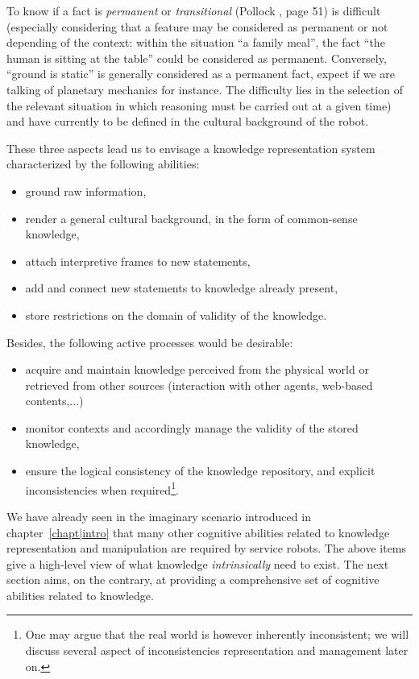 To know if a fact is \emph{permanent} or \emph{transitional} (Pollock
\cite{Pollock1998}, page 51) is difficult (especially considering that a
feature may be considered as permanent or not depending of the context: within
the situation ``a family meal'', the fact ``the human is sitting at the
table'' could be considered as permanent. Conversely, ``ground is static'' is
generally considered as a permanent fact, expect if we are talking of planetary
mechanics for instance. The difficulty lies in the selection of the relevant
situation in which reasoning must be carried out at a given time) and have
currently to be defined in the cultural background of the robot.

These three aspects lead us to envisage a knowledge representation system
characterized by the following abilities: 
\begin{itemize}
	\item ground raw information,
	\item render a general cultural background, in the form of common-sense knowledge,
	\item attach interpretive frames to new statements,
	\item add and connect new statements to knowledge already present,
	\item store restrictions on the domain of validity of the knowledge.
\end{itemize}

Besides, the following active processes would be desirable:
\begin{itemize}

    \item acquire and maintain knowledge perceived from the physical world or
        retrieved from other sources (interaction with other agents, web-based
        contents,...)

    \item monitor contexts and accordingly manage the validity of the stored
        knowledge,

    \item ensure the logical consistency of the knowledge repository, and
    explicit inconsistencies when required\footnote{One may argue that the
    real world is however inherently inconsistent; we will discuss several
    aspect of inconsistencies representation and management later on.}.

\end{itemize}

We have already seen in the imaginary scenario introduced in
chapter~\ref{chapt|intro} that many other cognitive abilities related to
knowledge representation and manipulation are required by service robots. The
above items give a high-level view of what knowledge \emph{intrinsically} need
to exist. The next section aims, on the contrary, at providing a
comprehensive set of cognitive abilities related to knowledge.


